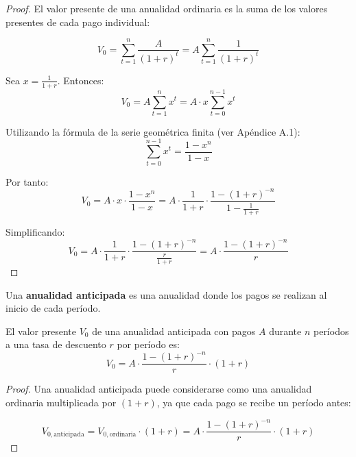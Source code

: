 \begin{proof}
El valor presente de una anualidad ordinaria es la suma de los valores presentes de cada pago individual:

$$V_0 = \sum_{t=1}^{n} \frac{A}{(1 + r)^t} = A \sum_{t=1}^{n} \frac{1}{(1 + r)^t}$$

Sea $x = \frac{1}{1 + r}$. Entonces:
$$V_0 = A \sum_{t=1}^{n} x^t = A \cdot x \sum_{t=0}^{n-1} x^t$$

Utilizando la fórmula de la serie geométrica finita (ver Apéndice A.1):
$$\sum_{t=0}^{n-1} x^t = \frac{1 - x^n}{1 - x}$$

Por tanto:
$$V_0 = A \cdot x \cdot \frac{1 - x^n}{1 - x} = A \cdot \frac{1}{1 + r} \cdot \frac{1 - (1 + r)^{-n}}{1 - \frac{1}{1 + r}}$$

Simplificando:
$$V_0 = A \cdot \frac{1}{1 + r} \cdot \frac{1 - (1 + r)^{-n}}{\frac{r}{1 + r}} = A \cdot \frac{1 - (1 + r)^{-n}}{r}$$
\end{proof}

\begin{center}
    
\end{center}

\begin{definicion}
Una \textbf{anualidad anticipada} es una anualidad donde los pagos se realizan al inicio de cada período.
\end{definicion}

\begin{teorema}
El valor presente $V_0$ de una anualidad anticipada con pagos $A$ durante $n$ períodos a una tasa de descuento $r$ por período es:
\begin{equation}
V_0 = A \cdot \frac{1 - (1 + r)^{-n}}{r} \cdot (1 + r)
\end{equation}
\end{teorema}

\begin{proof}
Una anualidad anticipada puede considerarse como una anualidad ordinaria multiplicada por $(1 + r)$, ya que cada pago se recibe un período antes:

$$V_{0,\text{anticipada}} = V_{0,\text{ordinaria}} \cdot (1 + r) = A \cdot \frac{1 - (1 + r)^{-n}}{r} \cdot (1 + r)$$
\end{proof}

\begin{center}
    
\end{center}

